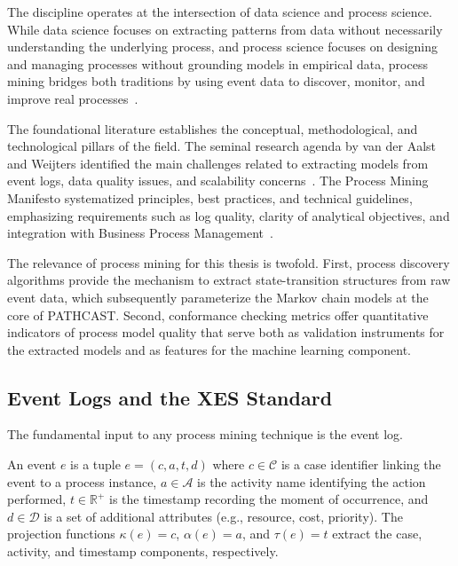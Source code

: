The discipline operates at the intersection of data science and process
science. While data science focuses on extracting patterns from data without
necessarily understanding the underlying process, and process science focuses
on designing and managing processes without grounding models in empirical
data, process mining bridges both traditions by using event data to
discover, monitor, and improve real processes~\cite{aalst2016process}.

The foundational literature establishes the conceptual, methodological, and
technological pillars of the field. The seminal research agenda by van der
Aalst and Weijters identified the main challenges related to extracting
models from event logs, data quality issues, and scalability
concerns~\cite{aalst2004workflow}. The Process Mining Manifesto systematized
principles, best practices, and technical guidelines, emphasizing
requirements such as log quality, clarity of analytical objectives, and
integration with Business Process Management~\cite{aalst2012process}.

The relevance of process mining for this thesis is twofold. First, process
discovery algorithms provide the mechanism to extract state-transition
structures from raw event data, which subsequently parameterize the Markov
chain models at the core of PATHCAST. Second, conformance checking
metrics offer quantitative indicators of process model quality that serve
both as validation instruments for the extracted models and as features for
the machine learning component.


\subsection{Event Logs and the XES Standard}
\label{sec:event-logs}

The fundamental input to any process mining technique is the event log.

\begin{definition}[Event]
\label{def:event}
An event $e$ is a tuple $e = (c, a, t, d)$ where $c \in \mathcal{C}$ is a
case identifier linking the event to a process instance, $a \in \mathcal{A}$
is the activity name identifying the action performed, $t \in \mathbb{R}^+$
is the timestamp recording the moment of occurrence, and
$d \in \mathcal{D}$ is a set of additional attributes (e.g., resource,
cost, priority). The projection functions $\kappa(e) = c$,
$\alpha(e) = a$, and $\tau(e) = t$ extract the case, activity, and
timestamp components, respectively.
\end{definition}

